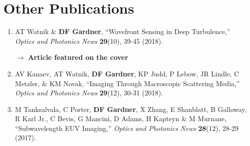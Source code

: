 \documentclass[letterpaper,12pt]{article}
\begin{document}
\section{Other Publications}
\begin{enumerate}[leftmargin=*]
	
	\item AT Watnik \& \textbf{DF Gardner}, ``Wavefront Sensing in Deep Turbulence,''  \emph{Optics and Photonics News} \textbf{29}(10), 39-45 (2018).
	
	\quad $\rightarrow$ \textbf{Article featured on the cover}
	
	\item AV Kanaev, AT Watnik, \textbf{DF Gardner}, KP Judd, P Lebow, JR Lindle, C Metzler, \& KM Novak, ``Imaging Through Macroscopic Scattering Media,'' \emph{Optics and Photonics News} \textbf{29}(12), 30-31 (2018).
	
	\item M Tanksalvala, C Porter, \textbf{DF Gardner}, X Zhang, E Shanblatt, B Galloway, R Karl Jr., C Bevis, G Mancini, D Adams, H Kapteyn \& M Murnane, ``Subwavelength EUV Imaging,'' \emph{Optics and Photonics News} \textbf{28}(12), 28-29 (2017).
	
\end{enumerate}
\end{document}
